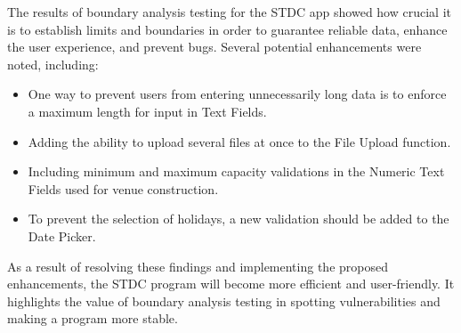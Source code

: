 \begin{justify}
    \newendline The results of boundary analysis testing for the STDC app showed how crucial it is to establish limits and boundaries in order to guarantee reliable data, enhance the user experience, and prevent bugs. Several potential enhancements were noted, including:\\

    \begin{itemize}
        \item One way to prevent users from entering unnecessarily long data is to enforce a maximum length for input in Text Fields.
        \item Adding the ability to upload several files at once to the File Upload function.
        \item Including minimum and maximum capacity validations in the Numeric Text Fields used for venue construction.
        \item To prevent the selection of holidays, a new validation should be added to the Date Picker.
    \end{itemize}


    \newendline As a result of resolving these findings and implementing the proposed enhancements, the STDC program will become more efficient and user-friendly. It highlights the value of boundary analysis testing in spotting vulnerabilities and making a program more stable.
\end{justify}
\clearpage

\vspace{0.25cm}
